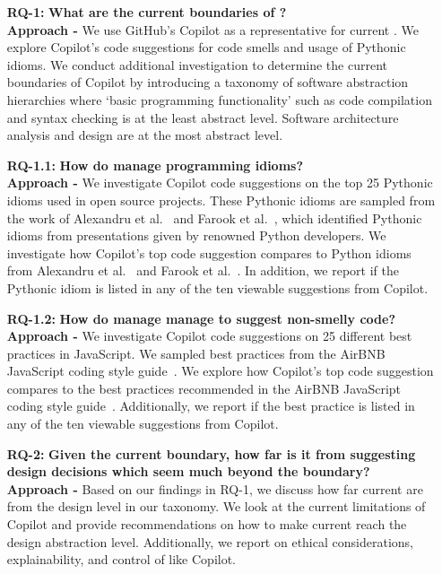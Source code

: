 \begin{enumerate}
  \item[\textbf{RQ-1: }]
  \textbf{What are the current boundaries of \cct{}?} \\
  \textbf{Approach -} We use GitHub's Copilot as a representative for current \cct{}. We explore Copilot's code suggestions for code smells and usage of Pythonic idioms. We conduct additional investigation to determine the current boundaries of Copilot by introducing a taxonomy of software abstraction hierarchies where ‘basic programming functionality’ such as code compilation and syntax checking is at the least abstract level. Software architecture analysis and design are at the most abstract level. 
  
  \item[\textbf{RQ-1.1: }]
  \textbf{How do \cct{} manage programming idioms?} \\
  \textbf{Approach -} We investigate Copilot code suggestions on the top 25 Pythonic idioms used in open source projects. These Pythonic idioms are sampled from the work of Alexandru et al.~\cite{Alexandru2018} and Farook et al.~\cite{idioms}, which identified Pythonic idioms from presentations given by renowned Python developers. We investigate how Copilot's top code suggestion compares to Python idioms from Alexandru et al.~\cite{Alexandru2018} and Farook et al.~\cite{idioms}. In addition, we report if the Pythonic idiom is listed in any of the ten viewable suggestions from Copilot.
  
  \item[\textbf{RQ-1.2: }]
  \textbf{How do \cct{} manage manage to suggest non-smelly code?} \\
\textbf{Approach -} We investigate Copilot code suggestions on 25 different best practices in JavaScript. We sampled best practices from the AirBNB JavaScript coding style guide~\cite{airbnb_code}. We explore how Copilot's top code suggestion compares to the best practices recommended in the AirBNB JavaScript coding style guide~\cite{airbnb_code}. Additionally, we report if the best practice is listed in any of the ten viewable suggestions from Copilot. 
 
  \item[\textbf{RQ-2: }]
  \textbf{Given the current boundary, how far is it from suggesting design decisions which seem much beyond the boundary?} \\
  \textbf{Approach -} Based on our findings in RQ-1, we discuss how far current \cct{} are from the design level in our taxonomy. We look at the current limitations of Copilot and provide recommendations on how to make current \cct{} reach the design abstraction level. Additionally, we report on ethical considerations, explainability, and control of \cct{} like Copilot. 
\end{enumerate}